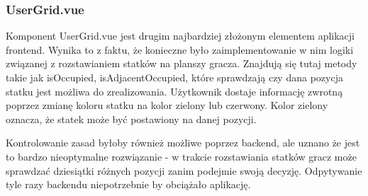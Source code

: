 \tocless\subsubsection{UserGrid.vue}
Komponent UserGrid.vue jest drugim najbardziej złożonym elementem aplikacji frontend. Wynika to z faktu, że konieczne było zaimplementowanie w nim logiki związanej z rozstawianiem statków na planszy gracza. Znajdują się tutaj metody takie jak isOccupied, isAdjacentOccupied, które sprawdzają czy dana pozycja statku jest możliwa do zrealizowania. Użytkownik dostaje informację zwrotną poprzez zmianę koloru statku na kolor zielony lub czerwony. Kolor zielony oznacza, że statek może być postawiony na danej pozycji.

Kontrolowanie zasad byłoby również możliwe poprzez backend, ale uznano że jest to bardzo nieoptymalne rozwiązanie - w trakcie rozstawiania statków gracz może sprawdzać dziesiątki różnych pozycji zanim podejmie swoją decyzję. Odpytywanie tyle razy backendu niepotrzebnie by obciążało aplikację.


